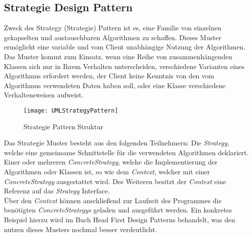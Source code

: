 \subsection{Strategie Design Pattern}\label{sec:StrategyPattern}
Zweck des Strategy (Strategie) Pattern ist es, eine Familie von einzelnen gekapselten und austauschbaren Algorithmen zu schaffen. Dieses Muster ermöglicht eine variable und vom Client unabhängige Nutzung der Algorithmen.\\
Das Muster kommt zum Einsatz, wenn eine Reihe von zusammenhängenden Klassen sich nur in Ihrem Verhalten unterscheiden, verschiedene Varianten eines Algorithmus erfordert werden, der Client keine Kenntnis von den vom Algorithmus verwendeten Daten haben soll, oder eine Klasse verschiedene Verhaltensweisen aufweist.\\
\vspace{-0.5cm}
\begin{center}
    \begin{figure}[h]
     \centering
     \texttt{[image: UMLStrategyPattern]}
     \caption{Strategie Pattern Struktur \cite{DesignPatterns}}
    \label{fig:StrategyPattern}
    \end{figure}
\end{center}
\vspace{-2cm}
Das Strategie Muster besteht aus den folgenden Teilnehmern: Die \textit{Strategy}, welche eine gemeinsame Schnittstelle für die verwendeten Algorithmen deklariert. Einer oder mehreren \textit{ConcreteStrategy}, welche die Implementierung der Algorithmen oder Klassen ist, so wie dem \textit{Context}, welcher mit einer \textit{ConcreteStrategy} ausgestattet wird. Des Weiteren besitzt der \textit{Context} eine Referenz auf das \textit{Strategy} Interface.\cite[S.383 ff]{DesignPatterns}\\
Über den \textit{Context} können anschließend zur Laufzeit des Programmes die benötigten \textit{ConcreteStrategys} geladen und ausgeführt werden. 
Ein konkretes Beispiel hierzu wird im Buch Head First Design Patterns \cite{HeadfirstDesignPatterns} behandelt, was den nutzen dieses Musters nochmal besser verdeutlicht.